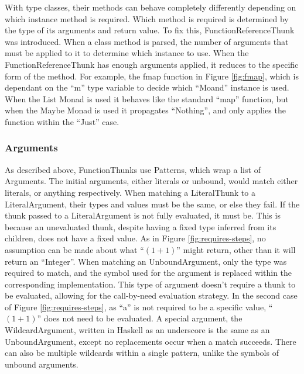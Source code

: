 With type classes, their methods can behave completely differently depending on which instance method is required. Which method is required is determined by the type of its arguments and return value. To fix this, FunctionReferenceThunk was introduced.
When a class method is parsed, the number of arguments that must be applied to it to determine which instance to use. When the FunctionReferenceThunk has enough arguments applied, it reduces to the specific form of the method. For example, the fmap function in Figure \ref{fig:fmap}, which is dependant on the ``m'' type variable to decide which ``Moand'' instance is used. When the List Monad is used it behaves like the standard ``map'' function, but when the Maybe Monad is used it propagates ``Nothing'', and only applies the function within the ``Just'' case.


\subsubsection{Arguments}
\label{args}
As described above, FunctionThunks use Patterns, which wrap a list of Arguments. The initial arguments, either literals or unbound, would match either literals, or anything respectively.
When matching a LiteralThunk to a LiteralArgument, their types and values must be the same, or else they fail. If the thunk passed to a LiteralArgument is not fully evaluated, it must be. This is because an unevaluated thunk, despite having a fixed type inferred from its children, does not have a fixed value. As in Figure \ref{fig:requires-steps}, no assumption can be made about what ``$(1+1)$'' might return, other than it will return an ``Integer''.
When matching an UnboundArgument, only the type was required to match, and the symbol used for the argument is replaced within the corresponding implementation. This type of argument doesn't require a thunk to be evaluated, allowing for the call-by-need evaluation strategy. In the second case of Figure \ref{fig:requires-steps}, as ``a'' is not required to be a specific value, ``$(1+1)$'' does not need to be evaluated.
A special argument, the WildcardArgument, written in Haskell as an underscore is the same as an UnboundArgument, except no replacements occur when a match succeeds. There can also be multiple wildcards within a single pattern, unlike the symbols of unbound arguments.


